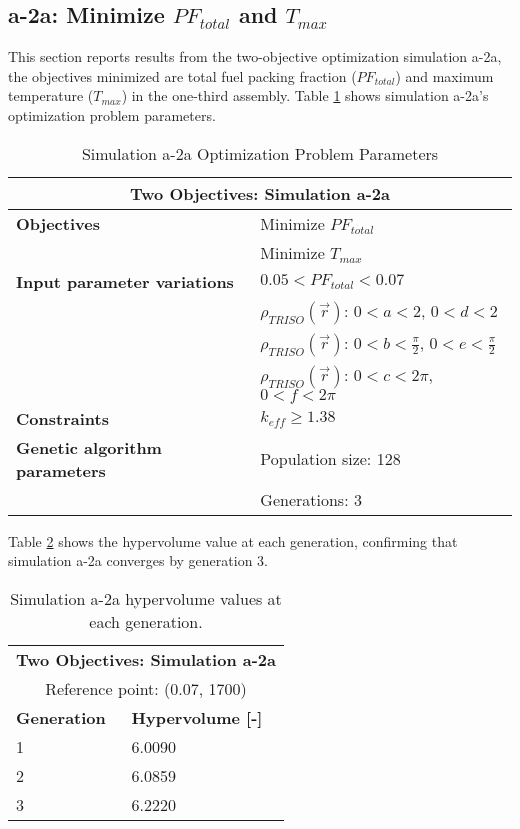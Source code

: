 \subsection{a-2a: Minimize $PF_{total}$ and $T_{max}$}
\label{sec:a-2a}
This section reports results from the two-objective optimization simulation a-2a, the 
objectives minimized are total fuel packing fraction ($PF_{total}$) and maximum 
temperature ($T_{max}$) in the one-third assembly.  
Table \ref{tab:simulationa2a} shows simulation a-2a's optimization problem parameters. 
\begin{table}[htbp!]
    \centering
    \onehalfspacing
    \caption{Simulation a-2a Optimization Problem Parameters}
	\label{tab:simulationa2a}
    \footnotesize
    \begin{tabular}{l|p{5.3cm}}
    \hline 
    \multicolumn{2}{c}{\textbf{Two Objectives: Simulation a-2a}} \\
    \hline 
    \textbf{Objectives} & Minimize $PF_{total}$ \\
    & Minimize $T_{max}$ \\
    \hline 
    \textbf{Input parameter variations} & $0.05<PF_{total}<0.07$ \\
    & $\rho_{TRISO}(\vec{r})$: $0<a<2$, $0<d<2$\\
    & $\rho_{TRISO}(\vec{r})$: $0<b<\frac{\pi}{2}$, $0<e<\frac{\pi}{2}$\\
    & $\rho_{TRISO}(\vec{r})$: $0<c<2\pi$, $0<f<2\pi$\\
    \hline
    \textbf{Constraints} & $k_{eff} \geq 1.38$\\ 
    \hline 
    \textbf{Genetic algorithm parameters} & Population size: 128 \\
    & Generations: 3 \\
    \hline
    \end{tabular}
\end{table}

Table \ref{tab:a2a-hypervolume} shows the hypervolume value at each generation, 
confirming that simulation a-2a converges by generation 3. 
\begin{table}[htbp!]
    \centering
    \onehalfspacing
    \caption{Simulation a-2a hypervolume values at each generation.}
	\label{tab:a2a-hypervolume}
    \footnotesize
    \begin{tabular}{ll}
    \hline 
    \multicolumn{2}{c}{\textbf{Two Objectives: Simulation a-2a}} \\
    \multicolumn{2}{c}{Reference point: (0.07, 1700)} \\
    \hline 
    \textbf{Generation} & \textbf{Hypervolume [-]} \\
    \hline
    1 & 6.0090 \\
    2 & 6.0859 \\
    3 & 6.2220 \\
    \hline
    \end{tabular}
\end{table}

